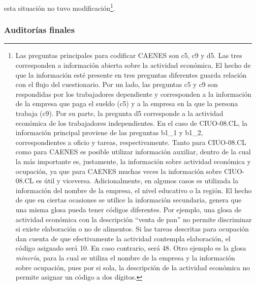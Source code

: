 \documentclass[
  12pt,
  spanish,
]{article}
\begin{document}
esta situación no tuvo modificación\footnote{Las preguntas principales
  para codificar CAENES son c5, c9 y d5. Las tres corresponden a
  información abierta sobre la actividad económica. El hecho de que la
  información esté presente en tres preguntas diferentes guarda relación
  con el flujo del cuestionario. Por un lado, las preguntas c5 y c9 son
  respondidas por los trabajadores dependiente y corresponden a la
  información de la empresa que paga el sueldo (c5) y a la empresa en la
  que la persona trabaja (c9). Por su parte, la pregunta d5 corresponde
  a la actividad económica de los trabajadores independientes. En el
  caso de CIUO-08.CL, la información principal proviene de las preguntas
  b1\_1 y b1\_2, correspondientes a oficio y tareas, respectivamente.
  Tanto para CIUO-08.CL como para CAENES es posible utilizar información
  auxiliar, dentro de la cual la más importante es, justamente, la
  información sobre actividad económica y ocupación, ya que para CAENES
  muchas veces la información sobre CIUO-08.CL es útil y viceversa.
  Adicionalmente, en algunos casos es utilizada la información del
  nombre de la empresa, el nivel educativo o la región. El hecho de que
  en ciertas ocasiones se utilice la información secundaria, genera que
  una misma glosa pueda tener códigos diferentes. Por ejemplo, una glosa
  de actividad económica con la descripción ``venta de pan'' no permite
  discriminar si existe elaboración o no de alimentos. Si las tareas
  descritas para ocupación dan cuenta de que efectivamente la actividad
  contempla elaboración, el código asignado será 10. En caso contrario,
  será 48. Otro ejemplo es la glosa \emph{minería}, para la cual se
  utiliza el nombre de la empresa y la información sobre ocupación, pues
  por si sola, la descripción de la actividad económica no permite
  asignar un código a dos dígitos.}.

\hypertarget{auditoruxedas-finales}{%
\subsubsection{Auditorías finales}\label{auditoruxedas-finales}}
\end{document}
